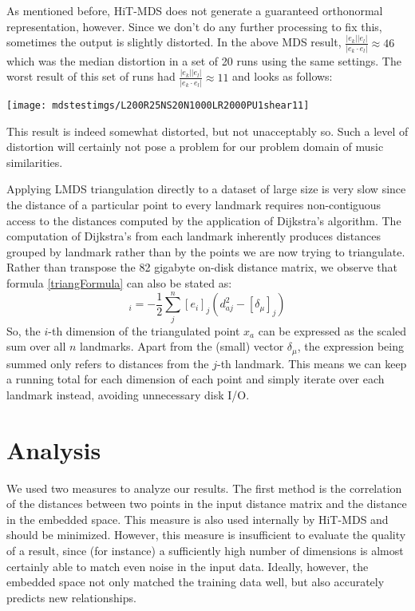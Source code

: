 \documentclass[10pt,fleqn,a4paper]{article}
\newcommand{\ds}[1]{d^2_{#1}}
\begin{document}
\begin{twocolumn}
As mentioned before, HiT-MDS does not generate a guaranteed orthonormal representation, however.  Since we don't do any further processing to fix this, sometimes the output is slightly distorted.  In the above MDS result,  $\frac{|e_k||e_l|}{|e_k \cdot e_l|} \approx 46$ which was the median distortion in a set of 20 runs using the same settings.  The worst result of this set of runs had $\frac{|e_k||e_l|}{|e_k \cdot e_l|} \approx 11$ and looks as follows:
\vspace{-7mm}
\begin{center}\texttt{[image: mdstestimgs/L200R25NS20N1000LR2000PU1shear11]}\end{center}
\vspace{-26mm}

This result is indeed somewhat distorted, but not unacceptably so.  Such a level of distortion will certainly not pose a problem for our problem domain of music similarities.  

Applying LMDS triangulation directly to a dataset of large size is very slow since the distance of a particular point to every landmark requires non-contiguous access to the distances computed by the application of Dijkstra's algorithm.  The computation of Dijkstra's from each landmark inherently produces distances grouped by landmark rather than by the points we are now trying to triangulate.  Rather than transpose the 82 gigabyte on-disk distance matrix, we observe that formula \eqref{triangFormula} can also be stated as:
%
\begin{equation}
[x_a]_i = -\frac{1}{2} \sum_j^n [e_i]_j (\ds{aj} - [\delta_\mu]_j) \label{triangFormula2}
\end{equation}
%
So, the $i$-th dimension of the triangulated point $x_a$ can be expressed as the scaled sum over all $n$ landmarks.  Apart from the (small) vector $\delta_\mu$, the expression being summed only refers to distances from the $j$-th landmark.  This means we can keep a running total for each dimension of each point and simply iterate over each landmark instead, avoiding unnecessary disk I/O.

\section{Analysis}

We used two measures to analyze our results.  The first method is the correlation of the distances between two points in the input distance matrix and the distance in the embedded space.  This measure is also used internally by HiT-MDS and should be minimized.  However, this measure is insufficient to evaluate the quality of a result, since (for instance) a sufficiently high number of dimensions is almost certainly able to match even noise in the input data.  Ideally, however, the embedded space not only matched the training data well, but also accurately predicts new relationships.


\end{twocolumn}
\end{document}
